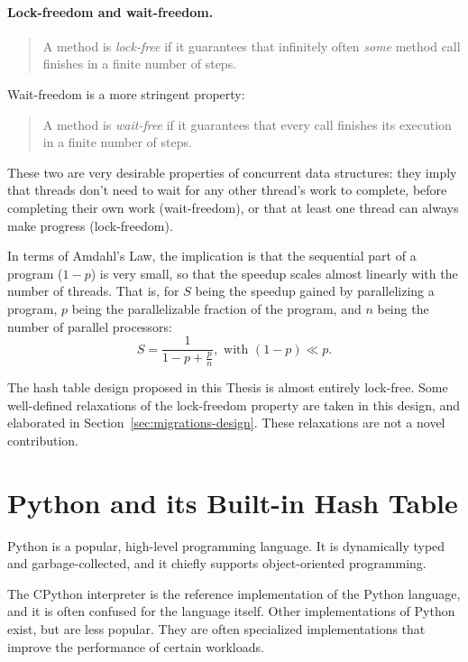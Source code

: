 \paragraph{Lock-freedom and wait-freedom.}
\begin{quote}
    A method is \emph{lock-free} if it guarantees that infinitely often \emph{some} method call finishes in a finite number of steps.
\end{quote}
Wait-freedom is a more stringent property:
\begin{quote}
    A method is \emph{wait-free} if it guarantees that every call finishes its execution in a finite number of steps.
\end{quote}

These two are very desirable properties of concurrent data structures: they imply that threads don't need to wait for any other thread's work to complete, before completing their own work (wait-freedom), or that at least one thread can always make progress (lock-freedom).

In terms of Amdahl's Law, the implication is that the sequential part of a program ($1 - p$) is very small, so that the speedup scales almost linearly with the number of threads.
That is, for $S$ being the speedup gained by parallelizing a program, $p$ being the parallelizable fraction of the program, and $n$ being the number of parallel processors:
\[
    S = \frac{1}{1 - p + \frac{p}{n}}, \text{~with~} (1 - p) \ll p.
\]

The hash table design proposed in this Thesis is almost entirely lock-free.
Some well-defined relaxations of the lock-freedom property are taken in this design, and elaborated in Section~\ref{sec:migrations-design}.
These relaxations are not a novel contribution.


\section{Python and its Built-in Hash Table}\label{sec:dict-intro}

Python is a popular, high-level programming language.
It is dynamically typed and garbage-collected, and it chiefly supports object-oriented programming.

The CPython interpreter is the reference implementation of the Python language, and it is often confused for the language itself.
Other implementations of Python exist, but are less popular.
They are often specialized implementations that improve the performance of certain workloads.

